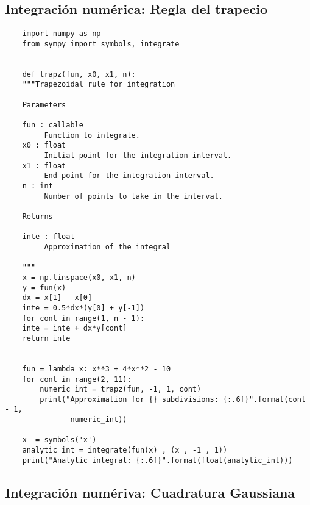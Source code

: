 \subsection{Integración numérica: Regla del trapecio}

\begin{verbatim}
    import numpy as np
    from sympy import symbols, integrate


    def trapz(fun, x0, x1, n):
    """Trapezoidal rule for integration
    
    Parameters
    ----------
    fun : callable
         Function to integrate.
    x0 : float
         Initial point for the integration interval.
    x1 : float
         End point for the integration interval.
    n : int
         Number of points to take in the interval.
    
    Returns
    -------
    inte : float
         Approximation of the integral
    
    """
    x = np.linspace(x0, x1, n)
    y = fun(x)
    dx = x[1] - x[0]
    inte = 0.5*dx*(y[0] + y[-1])
    for cont in range(1, n - 1):
    inte = inte + dx*y[cont]
    return inte


    fun = lambda x: x**3 + 4*x**2 - 10
    for cont in range(2, 11):
        numeric_int = trapz(fun, -1, 1, cont)
        print("Approximation for {} subdivisions: {:.6f}".format(cont - 1,
               numeric_int))

    x  = symbols('x')
    analytic_int = integrate(fun(x) , (x , -1 , 1))
    print("Analytic integral: {:.6f}".format(float(analytic_int)))
\end{verbatim}

\subsection{Integración numériva: Cuadratura Gaussiana}

